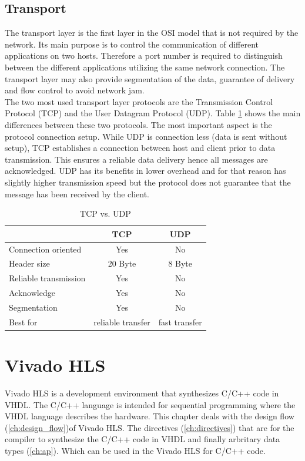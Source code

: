 \subsection{Transport} 
The transport layer is the first layer in the OSI model that is not required by
the network. Its main purpose is to control the communication of different
applications on two hosts. Therefore a port number is required to distinguish
between the different applications utilizing the same network connection. The
transport layer may also provide segmentation of the data, guarantee of delivery and flow control to avoid network jam.
\\

The two most used transport layer protocols are the Transmission Control
Protocol (TCP) and the User Datagram Protocol (UDP). Table \ref{tab:tcpudp}
shows the main differences between these two protocols. The most important
aspect is the protocol connection setup. While UDP is connection less (data is
sent without setup), TCP establishes a connection between host and client
prior to data transmission. This ensures a reliable data delivery hence all
messages are acknowledged. UDP has its benefits in lower overhead and for that
reason has slightly higher transmission speed but the protocol does not
guarantee that the message has been received by the client.

\begin{table}[h]
    \centering
    \begin{tabular}{ l  c  c }
        \toprule
         & \textbf{TCP} & \textbf{UDP} \\
        \midrule
        Connection oriented & Yes & No \\
        Header size & 20 Byte & 8 Byte \\
        Reliable transmission & Yes & No \\
        Acknowledge & Yes & No \\
        Segmentation & Yes & No \\
        Best for & reliable transfer & fast transfer  \\
        \bottomrule
    \end{tabular}
    \caption{TCP vs. UDP}
    \label{tab:tcpudp}
\end{table}

\section{Vivado HLS} \label{ch:th:hls}
Vivado HLS is a development environment that synthesizes C/C++ code in VHDL. The C/C++ language is intended for sequential programming where the VHDL language describes the hardware. This chapter deals with the design flow (\ref{ch:design_flow})of Vivado HLS. The directives (\ref{ch:directives}) that are for the compiler to synthesize the C/C++ code in VHDL and finally arbritary data types (\ref{ch:ap}). Which can be used in the Vivado HLS for C/C++ code.

